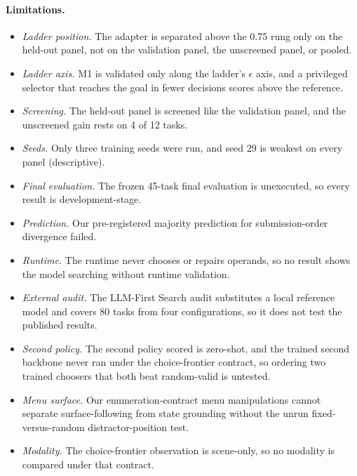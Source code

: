 \paragraph{Limitations.}
\begin{itemize}
\item \emph{Ladder position.} The adapter is separated above the 0.75 rung only on the held-out panel, not on the validation panel, the unscreened panel, or pooled.
\item \emph{Ladder axis.} M1 is validated only along the ladder's $\epsilon$ axis, and a privileged selector that reaches the goal in fewer decisions scores above the reference.
\item \emph{Screening.} The held-out panel is screened like the validation panel, and the unscreened gain rests on 4 of 12 tasks.
\item \emph{Seeds.} Only three training seeds were run, and seed 29 is weakest on every panel (descriptive).
\item \emph{Final evaluation.} The frozen 45-task final evaluation is unexecuted, so every result is development-stage.
\item \emph{Prediction.} Our pre-registered majority prediction for submission-order divergence failed.
\item \emph{Runtime.} The runtime never chooses or repairs operands, so no result shows the model searching without runtime validation.
\item \emph{External audit.} The LLM-First Search audit substitutes a local reference model and covers 80 tasks from four configurations, so it does not test the published results.
\item \emph{Second policy.} The second policy scored is zero-shot, and the trained second backbone never ran under the choice-frontier contract, so ordering two trained choosers that both beat random-valid is untested.
\item \emph{Menu surface.} Our enumeration-contract menu manipulations cannot separate surface-following from state grounding without the unrun fixed-versus-random distractor-position test.
\item \emph{Modality.} The choice-frontier observation is scene-only, so no modality is compared under that contract.
\end{itemize}

